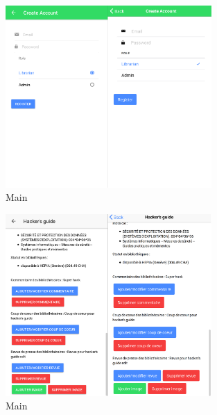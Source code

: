 \documentclass[a4paper, 12pt]{article}
\begin{document}
\begin{figure}
    \begin{center}
        \includegraphics[width=0.7\textwidth]{images/screenshots/android_iphone_6.png}
    \end{center}
    \caption{Main}
\end{figure}
\begin{figure}
    \begin{center}
        \includegraphics[width=0.7\textwidth]{images/screenshots/android_iphone_7.png}
    \end{center}
    \caption{Main}
\end{figure}
\end{document}
